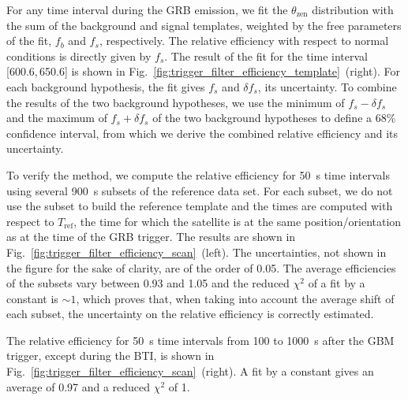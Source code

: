 \documentclass[preprint]{aastex631}
\begin{document}
For any time interval during the GRB emission, we fit the $\theta_\mathrm{zen}$ distribution with the sum of the background and signal templates, weighted by the free parameters of the fit, $f_b$ and $f_s$, respectively. The relative efficiency with respect to normal conditions is directly given by $f_s$. The result of the fit for the time interval [600.6,\,650.6] is shown in Fig.~\ref{fig:trigger_filter_efficiency_template}~(right). For each background hypothesis, the fit gives $f_s$ and $\delta f_s$, its uncertainty. To combine the results of the two background hypotheses, we use the minimum of $f_s - \delta f_s$ and the maximum of $f_s + \delta f_s$ of the two background hypotheses to define a 68\% confidence interval, from which we derive the combined relative efficiency and its uncertainty.
 
To verify the method, we compute the relative efficiency for 50~s time intervals using several 900~s subsets of the reference data set. For each subset, we do not use the subset to build the reference template and the times are computed with respect to $T_\mathrm{ref}$, the time for which the satellite is at the same position/orientation as at the time of the GRB trigger. The results are shown in Fig.~\ref{fig:trigger_filter_efficiency_scan}~(left). The uncertainties, not shown in the figure for the sake of clarity, are of the order of 0.05. The average efficiencies of the subsets vary between 0.93 and 1.05 and the reduced $\chi^2$ of a fit by a constant is $\sim 1$, which proves that, when taking into account the average shift of each subset, the uncertainty on the relative efficiency is correctly estimated.

The relative efficiency for 50~s time intervals from 100 to 1000~s after the GBM trigger, except during the BTI, is shown in Fig.~\ref{fig:trigger_filter_efficiency_scan}~(right). A fit by a constant gives an average of 0.97 and a reduced $\chi^2$ of 1.
\end{document}
